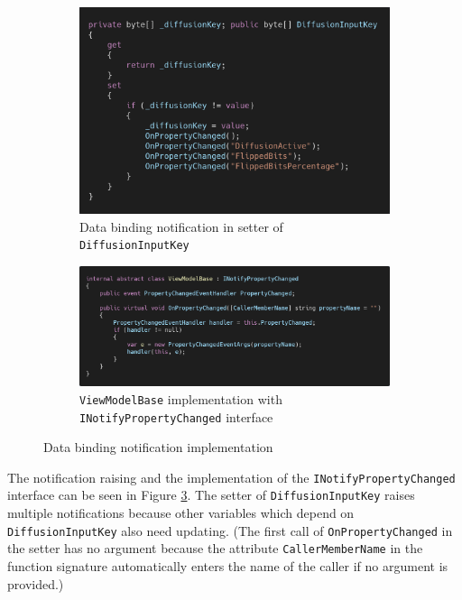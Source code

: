 \begin{figure}[!hbt]
\centering
\begin{subfigure}[t]{0.6\textwidth}
\centering
\includegraphics[width=\textwidth]{figures/code/mvvm-arch/onpropertychanged.png}
\caption{Data binding notification in setter of \texttt{DiffusionInputKey}}
\label{fig:mvvm.onpropertychanged}
\end{subfigure}
\begin{subfigure}[t]{\textwidth}
\centering
\includegraphics[width=\textwidth]{figures/code/mvvm-arch/viewmodelbase.png}
\caption{\texttt{ViewModelBase} implementation with \texttt{INotifyPropertyChanged} interface}
\label{fig:mvvm.viewmodelbase}
\end{subfigure}
\caption{Data binding notification implementation}
\label{fig:mvvm.databindingnotification}
\end{figure}

The notification raising and the implementation of the \texttt{INotifyPropertyChanged} interface can be seen in Figure \ref{fig:mvvm.databindingnotification}. The setter of \texttt{DiffusionInputKey} raises multiple notifications because other variables which depend on \texttt{DiffusionInputKey} also need updating. (The first call of \texttt{OnPropertyChanged}  in the setter has no argument because the attribute \texttt{CallerMemberName} in the function signature automatically enters the name of the caller if no argument is provided.)

